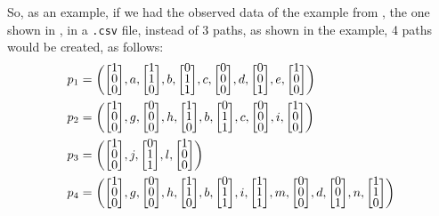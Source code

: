 So, as an example, if we had the observed data of the example from
\cite{moreira2018enhanced}, the one shown in , in a
\verb|.csv| file, instead of 3 paths, as shown in the example, 4 paths would be
created, as follows:
\newcommand{\colvec}[2][1]{%
  \scalebox{#1}{%
    \renewcommand{\arraystretch}{.7}%
    $\begin{bmatrix}#2\end{bmatrix}$%
  }
}
\setlength\arraycolsep{2pt}
\begin{align*}
  p_1&= \left(\colvec{1\\0\\0},a,\colvec{1\\1\\0},b,\colvec{0\\1\\1},c,\colvec{0\\0\\0},d,\colvec{0\\0\\1},e,\colvec{1\\0\\0}\right) \\
  p_2&= \left(\colvec{1\\0\\0},g,\colvec{0\\0\\0},h,\colvec{1\\1\\0},b,\colvec{0\\1\\1},c,\colvec{0\\0\\0},i,\colvec{1\\0\\0}\right) \\
  p_3&= \left(\colvec{1\\0\\0},j,\colvec{0\\1\\1},l,\colvec{1\\0\\0}\right) \\
  p_4&= \left(\colvec{1\\0\\0},g,\colvec{0\\0\\0},h,\colvec{1\\1\\0},b,\colvec{0\\1\\1},i,\colvec{1\\1\\1},m,\colvec{0\\0\\0},d,\colvec{0\\0\\1},n,\colvec{1\\1\\0}\right) \\
\end{align*}
